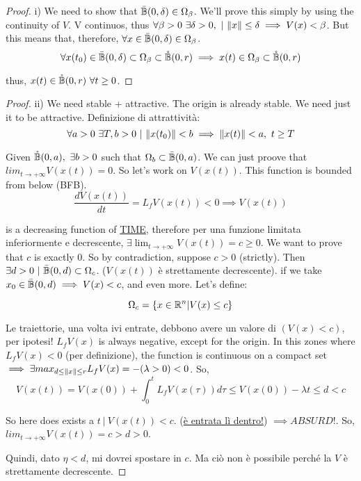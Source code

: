 \begin{proof}{i)}
We need to show that $\bar{\mathbb{B}}(0,\delta) \in \Omega_\beta$. We'll prove this simply by using the continuity of $V$. V continuos, thus $\forall \beta > 0\ \exists \delta > 0,\ |\ \norma{x} \leq \delta \implies V(x) < \beta$. But this means that, therefore, $\forall x \in \bar{\mathbb{B}}(0,\delta) \in \Omega_\beta$.
\[
	\forall x(t_0) \in \bar{\mathbb{B}}(0,\delta) \subset \Omega_\beta \subset \mathring{\mathbb{B}}(0,r) \implies x(t) \in \Omega_\beta \subset \mathring{\mathbb{B}}(0,r)
\]

thus, $x(t) \in \mathring{\mathbb{B}}(0,r)\ \forall t \geq 0$.

\end{proof}

\begin{proof}{ii)} \newline
We need stable + attractive. The origin is already stable. We need just it to be attractive. Definizione di attrattività:
\[
	\forall a > 0\ \exists T,b > 0\ |\ \lVert x(t_0)\rVert < b \implies \lVert x(t)\rVert < a,\ t \geq T
\]

Given $\mathring{\mathbb{B}}(0,a),\ \exists b > 0$ such that $\Omega_b \subset \bar{\mathbb{B}}(0,a)$. We can just proove that $lim_{t\to +\infty}{V(x(t))} = 0$. So let's work on $V(x(t))$. This function is bounded from below (BFB).
\[
	\frac{dV(x(t))}{dt} = L_fV(x(t)) < 0 \implies V(x(t))
\]

is a decreasing function of \underline{TIME}, therefore per una funzione limitata inferiormente e decrescente, $\exists \lim_{t\to +\infty}{V(x(t))} = c \geq 0$. We want to prove that $c$ is exactly 0. 
So by contradiction, suppose $c > 0$ (strictly). Then $\exists d > 0\ |\ \cball(0,d) \subset \Omega_c$. ($V(x(t))$ è strettamente decrescente). if we take $x_0 \in \bar{\mathbb{B}}(0,d) \implies V(x) < c$, and even more. Let's define:

\[
	\Omega_c = \{x \in \mathbb{R}^n | V(x) \leq c\}
\]

Le traiettorie, una volta ivi entrate, debbono avere un valore di $(V(x) < c)$, per ipotesi! 
$L_fV(x)$ is always negative, except for the origin. In this zones where $L_fV(x) < 0$ (per definizione), the function is continuous on a compact set $\implies \exists max_{d\leq \lVert x\rVert \leq r}{L_fV(x)} = -(\lambda > 0) < 0$. So,
\[
	V(x(t)) = V(x(0)) + \int_0^t{L_fV(x(\tau))d\tau} \leq V(x(0)) - \lambda t \leq d < c
\]

So here does exists a $t\ |\ V(x(t)) < c$. (\underline{è entrata lì dentro!}) $\implies ABSURD!$. So, $lim_{t\to +\infty}{V(x(t))} = c > d > 0$.

Quindi, dato $\eta < d$, mi dovrei spostare in $c$. Ma ciò non è possibile perché la $V$ è strettamente decrescente.

\end{proof}

